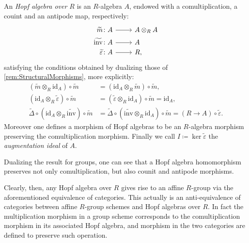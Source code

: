 \documentclass[../Main]{subfiles}
\begin{document}
\begin{defn}\label{defn:HopfAlgebra}
	An {\em Hopf algebra over $R$} is an $R$-algebra $A$,
	endowed with a comultiplication, a couint and an antipode map,
	respectively:
	\begin{equation*}
			\begin{tikzcd}[row sep = 0ex
         ,/tikz/column 1/.append style={anchor=base east}
         ,/tikz/column 2/.append style={anchor=base west}
         ,/tikz/column 3/.append style={anchor=base east}]
			\widetilde{m}\colon A \arrow[r, "", rightarrow] &
			A \otimes_R A \\
			\widetilde{\mathrm{inv}}\colon A \arrow[r, "", rightarrow] &
			A \\
			\widetilde{\varepsilon} \colon A \arrow[r, "", rightarrow] &
			R,
		\end{tikzcd}
	\end{equation*} 
	satisfying the conditions obtained by dualizing those
	of \cref{rem:StructuralMorphisms}, more explicitly:
	\begin{align*}
		( \widetilde{m} \otimes_R \mathrm{id}_{ A } ) \circ \widetilde{m} &=
		( \mathrm{id}_{ A } \otimes_R \widetilde{m} ) \circ \widetilde{m},\\
		( \mathrm{id}_{ A } \otimes_R \widetilde{\varepsilon} ) \circ \widetilde{m} &=
		( \widetilde{\varepsilon} \otimes_R \mathrm{id}_{ A } ) \circ \widetilde{m} =
		\mathrm{id}_{ A },\\
		\widetilde{\Delta} \circ ( \mathrm{id}_{ A } \otimes_R \widetilde{\mathrm{inv}} ) 
		\circ \widetilde{m} &=
		\widetilde{\Delta} \circ ( \widetilde{\mathrm{inv}} \otimes_R \mathrm{id}_{ A } ) 
		\circ \widetilde{m} =
		(R \to A) \circ \widetilde{\varepsilon}
	.\end{align*} 
	Moreover one defines a morphism of Hopf algebras to be an $R$-algebra
	morphism preserving the comultiplication morphism.
	Finally we call $I \coloneqq \ker \widetilde{\varepsilon}$ the 
	{\em augmentation ideal} of $A$.
\end{defn}


\begin{rem}[]
	Dualizing the result for groups, one can see that a Hopf algebra
	homomorphism preserves not only comultiplication, but also
	counit and antipode morphisms.
\end{rem}


\begin{rem}
	Clearly, then, any Hopf algebra over $R$ gives rise
	to an affine $R$-group via the aforementioned equivalence of categories.
	This actually is an anti-equivalence of categories between affine
	$R$-group schemes and Hopf algebras over $R$.
	In fact	the multiplication morphism in a group scheme
	corresponds to the comultiplication morphism in its 
	associated Hopf algebra, and morphism in the two categories are defined
	to preserve such operation.
\end{rem}
\end{document}
